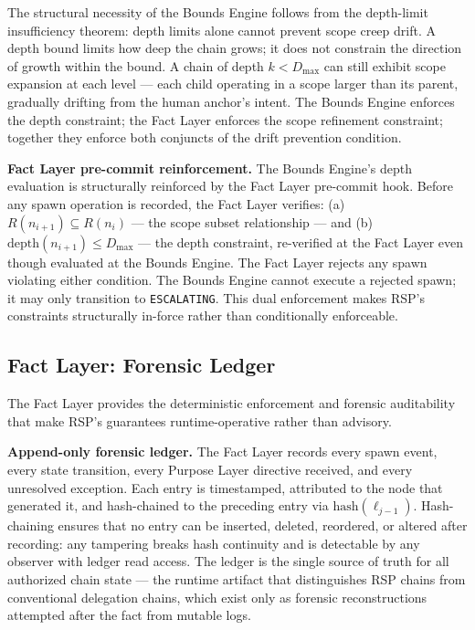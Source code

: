 The structural necessity of the Bounds Engine follows from the depth-limit insufficiency theorem: depth limits alone cannot prevent scope creep drift. A depth bound limits how deep the chain grows; it does not constrain the direction of growth within the bound. A chain of depth $k < D_{\mathrm{max}}$ can still exhibit scope expansion at each level — each child operating in a scope larger than its parent, gradually drifting from the human anchor's intent. The Bounds Engine enforces the depth constraint; the Fact Layer enforces the scope refinement constraint; together they enforce both conjuncts of the drift prevention condition.

\medskip
\noindent\textbf{Fact Layer pre-commit reinforcement.} The Bounds Engine's depth evaluation is structurally reinforced by the Fact Layer pre-commit hook. Before any spawn operation is recorded, the Fact Layer verifies: (a) $R(n_{i+1}) \subseteq R(n_i)$ — the scope subset relationship — and (b) $\mathrm{depth}(n_{i+1}) \leq D_{\mathrm{max}}$ — the depth constraint, re-verified at the Fact Layer even though evaluated at the Bounds Engine. The Fact Layer rejects any spawn violating either condition. The Bounds Engine cannot execute a rejected spawn; it may only transition to \texttt{ESCALATING}. This dual enforcement makes RSP's constraints structurally in-force rather than conditionally enforceable.

\subsection{Fact Layer: Forensic Ledger}
\label{sec:rs-fact-ledger}

The Fact Layer provides the deterministic enforcement and forensic auditability that make RSP's guarantees runtime-operative rather than advisory.

\medskip
\noindent\textbf{Append-only forensic ledger.} The Fact Layer records every spawn event, every state transition, every Purpose Layer directive received, and every unresolved exception. Each entry is timestamped, attributed to the node that generated it, and hash-chained to the preceding entry via $\mathrm{hash}(\ell_{j-1})$. Hash-chaining ensures that no entry can be inserted, deleted, reordered, or altered after recording: any tampering breaks hash continuity and is detectable by any observer with ledger read access. The ledger is the single source of truth for all authorized chain state — the runtime artifact that distinguishes RSP chains from conventional delegation chains, which exist only as forensic reconstructions attempted after the fact from mutable logs.


